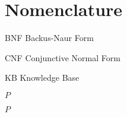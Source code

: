 \chapter{Nomenclature}

\begin{Nomencl}
    \item[BNF] Backus-Naur Form
    \item[CNF] Conjunctive Normal Form
    \item[KB] Knowledge Base
    
   \item[$P$]

   \item[$P$]

\end{Nomencl}


\endinput
